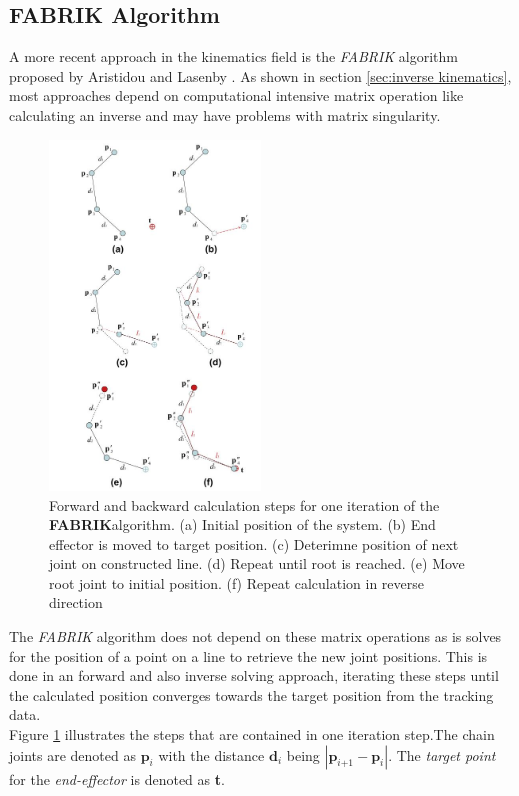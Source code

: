 \subsection{FABRIK Algorithm}
\label{sec:fabrik_algorithm}
A more recent approach in the kinematics field is the \textit{FABRIK} algorithm proposed by Aristidou and Lasenby \cite{Aristidou.2011}. As shown in section \ref{sec:inverse kinematics}, most approaches depend on computational intensive matrix operation like calculating an inverse and may have problems with matrix singularity.\\
\begin{figure}
\includegraphics[width=0.5\textwidth]{images/FabrikIteration.jpg}
\caption{Forward and backward calculation steps for one iteration of the \textbf{FABRIK}algorithm. (a) Initial position of the system. (b) End effector is moved to target position. (c) Deterimne position of next joint on constructed line. (d) Repeat until root is reached. (e) Move root joint to initial position. (f) Repeat calculation in reverse direction \cite{Aristidou.2011} }
\label{fig:Fabrik_Iteration}
\end{figure}
The \textit{FABRIK} algorithm does not depend on these matrix operations as is solves for the position of a point on a line to retrieve the new joint positions. This is done in an forward and also inverse solving approach, iterating these steps until the calculated position converges towards the target position from the tracking data.
\\Figure \ref{fig:Fabrik_Iteration} illustrates the steps that are contained in one iteration step.The chain joints are denoted as $\textbf{p}_{\textit{i}}$ with the distance $\textbf{d}_{i}$ being $|\textbf{p}_{\textit{i+1}}-\textbf{p}_{\textit{i}}|$. The \textit{target point} for the \textit{end-effector} is denoted as \textbf{t}.
